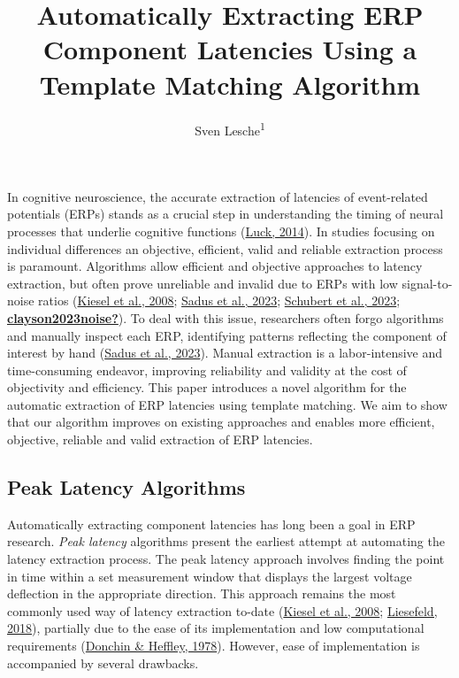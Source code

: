 \documentclass[
  man]{apa7}
\title{Automatically Extracting ERP Component Latencies Using a Template Matching Algorithm}
\author{Sven Lesche\textsuperscript{1}}
\date{}
\affiliation{\vspace{0.5cm}\textsuperscript{1} Ruprecht-Karls-University Heidelberg}
\begin{document}
\maketitle

In cognitive neuroscience, the accurate extraction of latencies of event-related potentials (ERPs) stands as a crucial step in understanding the timing of neural processes that underlie cognitive functions (\protect\hyperlink{ref-luck2014introduction}{Luck, 2014}). In studies focusing on individual differences an objective, efficient, valid and reliable extraction process is paramount. Algorithms allow efficient and objective approaches to latency extraction, but often prove unreliable and invalid due to ERPs with low signal-to-noise ratios (\protect\hyperlink{ref-kiesel2008measurement}{Kiesel et al., 2008}; \protect\hyperlink{ref-sadus2023multiverse}{Sadus et al., 2023}; \protect\hyperlink{ref-schubert2023robust}{Schubert et al., 2023}; \protect\hyperlink{ref-clayson2023noise}{\textbf{clayson2023noise?}}). To deal with this issue, researchers often forgo algorithms and manually inspect each ERP, identifying patterns reflecting the component of interest by hand (\protect\hyperlink{ref-sadus2023multiverse}{Sadus et al., 2023}). Manual extraction is a labor-intensive and time-consuming endeavor, improving reliability and validity at the cost of objectivity and efficiency. This paper introduces a novel algorithm for the automatic extraction of ERP latencies using template matching. We aim to show that our algorithm improves on existing approaches and enables more efficient, objective, reliable and valid extraction of ERP latencies.

\hypertarget{peak-latency-algorithms}{%
\subsection{Peak Latency Algorithms}\label{peak-latency-algorithms}}

Automatically extracting component latencies has long been a goal in ERP research. \emph{Peak latency} algorithms present the earliest attempt at automating the latency extraction process. The peak latency approach involves finding the point in time within a set measurement window that displays the largest voltage deflection in the appropriate direction. This approach remains the most commonly used way of latency extraction to-date (\protect\hyperlink{ref-kiesel2008measurement}{Kiesel et al., 2008}; \protect\hyperlink{ref-liesefeld2018estimating}{Liesefeld, 2018}), partially due to the ease of its implementation and low computational requirements (\protect\hyperlink{ref-donchin1978multivariate}{Donchin \& Heffley, 1978}). However, ease of implementation is accompanied by several drawbacks.
\end{document}
